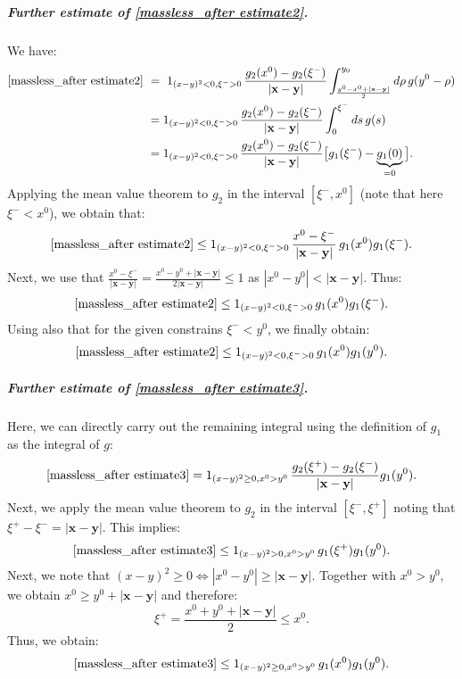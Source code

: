 \documentclass[b5paper,draft,openbib,12pt]{memoir}
\newcommand{\vx}{\mathbf{x}}
\newcommand{\vy}{\mathbf{y}}
\begin{document}
\subparagraph{Further estimate of \eqref{massless_after estimate2}.}
We have:
\begin{align}
	 \eqref{massless_after estimate2} ~&=~ 1_{(x-y)^2 < 0, \xi^- >0} \, \frac{ g_2(x^0) - g_2(\xi^-) }{|\vx-\vy|} \int_{\frac{y^0-x^0+|\vx-\vy|}{2}}^{y_0} d \rho \, g(y^0-\rho) \nonumber\\
&= 1_{(x-y)^2 < 0, \xi^- >0} \, \frac{g_2(x^0) - g_2(\xi^-)}{|\vx-\vy|} \int_{0}^{\xi^-} d s \, g(s)\nonumber\\
&= 1_{(x-y)^2 < 0, \xi^- >0} \, \frac{g_2(x^0) - g_2(\xi^-)}{|\vx-\vy|} \big[ g_1(\xi^-) - \underbrace{g_1(0)}_{=0} \big].
\label{eq:secondline159b}
\end{align}
Applying the mean value theorem to $g_2$ in the interval $[\xi^-,x^0]$ 
(note that here $\xi^-<x^0$), we obtain that:
\begin{equation}
	\eqref{massless_after estimate2} \leq 1_{(x-y)^2 < 0, \xi^- >0} \, \frac{x^0-\xi^-}{|\vx-\vy|}\, g_1(x^0) g_1(\xi^-).
\end{equation}
Next, we use that $\frac{x^0-\xi^-}{|\vx-\vy|}  = \frac{x^0-y^0+|\vx-\vy|}{2|\vx-\vy|} \leq 1$ as $|x^0-y^0| < |\vx-\vy|$. Thus:
\begin{equation}
	\eqref{massless_after estimate2} \leq 1_{(x-y)^2 < 0, \xi^- >0} \, g_1(x^0) g_1(\xi^-).
\end{equation}
Using also that for the given constrains $\xi^- < y^0$, we finally obtain:
\begin{equation}
	\eqref{massless_after estimate2} \leq 1_{(x-y)^2 < 0, \xi^- >0} \, g_1(x^0) g_1(y^0).
\label{eq:resultmasslessafterestimate2}
\end{equation}


\subparagraph{Further estimate of \eqref{massless_after estimate3}.}
Here, we can directly carry out the remaining integral using the definition 
of $g_1$ as the integral of $g$:
\begin{equation}
	\eqref{massless_after estimate3} = 1_{(x-y)^2\ge0,x^0>y^0}\, \frac{g_2(\xi^+)-g_2(\xi^-)}{|\vx-\vy|} g_1(y^0).
\end{equation}
Next, we apply the mean value theorem to $g_2$ in the interval 
$[\xi^-,\xi^+]$ noting that $\xi^+\!\!-\xi^- = |\vx-\vy|$. This implies:
\begin{equation}
	\eqref{massless_after estimate3} \leq 1_{(x-y)^2>0,x^0>y^0} \,g_1(\xi^+) g_1(y^0).
\end{equation}
Next, we note that $(x-y)^2 \ge 0 \Leftrightarrow |x^0-y^0| \ge |\vx-\vy|$. 
Together with $x^0>y^0$, we obtain $x^0\ge y^0 +|\vx-\vy|$ and therefore:
\begin{equation}
	\xi^+ = \frac{x^0+y^0 +|\vx-\vy|}{2} \leq x^0.
\end{equation}
Thus, we obtain:
\begin{equation}
	\eqref{massless_after estimate3} \leq 1_{(x-y)^2\ge0,x^0>y^0} \, g_1(x^0) g_1(y^0).
	\label{eq:resultmasslessafterestimate3}
\end{equation}
\end{document}
